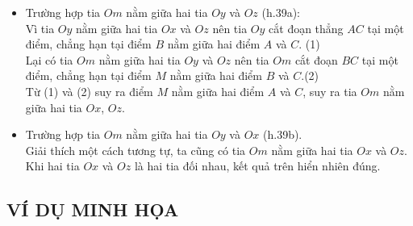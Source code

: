 \begin{itemize}
\item Trường hợp tia $Om$ nằm giữa hai tia $Oy$ và $Oz$ (h.39a):\\
Vì tia $Oy$ nằm giữa hai tia $Ox$ và $Oz$ nên tia $Oy$ cắt đoạn thẳng $AC$ tại một điểm, chẳng hạn tại điểm $B$ nằm giữa hai điểm $A$ và $C$. \hfill (1)\\
Lại có tia $Om$ nằm giữa hai tia $Oy$ và $Oz$ nên tia $Om$ cắt đoạn $BC$ tại một điểm, chẳng hạn tại điểm $M$ nằm giữa hai điểm $B$ và $C$.\hfill (2)\\
Từ (1) và (2) suy ra điểm $M$ nằm giữa hai điểm $A$ và $C$, suy ra tia $Om$ nằm giữa hai tia $Ox$, $Oz$.
\item Trường hợp tia $Om$ nằm giữa hai tia $Oy$ và $Ox$ (h.39b).\\
Giải thích một cách tương tự, ta cũng có tia $Om$ nằm giữa hai tia $Ox$ và $Oz$.\\
Khi hai tia $Ox$ và $Oz$ là hai tia đối nhau, kết quả trên hiển nhiên đúng.

\end{itemize}
\subsection{VÍ DỤ MINH HỌA}

